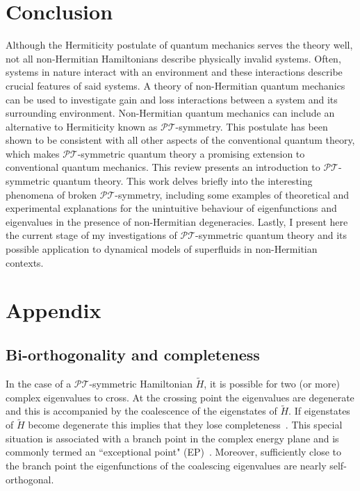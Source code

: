 \documentclass[12pt, a4paper]{report}
\newcommand\PT{\(\mathcal{PT}\)}
\begin{document}
\chapter{Conclusion}\label{Conclusion}
Although the Hermiticity postulate of quantum mechanics serves the theory well, not all non-Hermitian Hamiltonians describe physically invalid systems. Often, systems in nature interact with an environment and these interactions describe crucial features of said systems. A theory of non-Hermitian quantum mechanics can be used to investigate gain and loss interactions between a system and its surrounding environment. Non-Hermitian quantum mechanics can include an alternative to Hermiticity known as \PT-symmetry. This postulate has been shown to be consistent with all other aspects of the conventional quantum theory, which makes \PT-symmetric quantum theory a promising extension to conventional quantum mechanics. This review presents an introduction to \PT-symmetric quantum theory. This work delves briefly into the interesting phenomena of broken \PT-symmetry, including some examples of theoretical and experimental explanations for the unintuitive behaviour of eigenfunctions and eigenvalues in the presence of non-Hermitian degeneracies. Lastly, I present here the current stage of my investigations of \PT-symmetric quantum theory and its possible application to dynamical models of superfluids in non-Hermitian contexts.


\chapter{Appendix}\label{appendix}
\section{Bi-orthogonality and completeness}\label{Biorthogonal}
In the case of a \PT-symmetric Hamiltonian $\tilde{H}$, it is possible for two (or more) complex eigenvalues to cross. At the crossing point the eigenvalues are degenerate and this is accompanied by the coalescence of the eigenstates of $\tilde{H}$. If eigenstates of $\tilde{H}$ become degenerate this implies that they lose completeness~\cite{Brody_2013}. This special situation is associated with a branch point in the complex energy plane and is commonly termed an ``exceptional point" (EP)~\cite{Moiseyev}. Moreover, sufficiently close to the branch point the eigenfunctions of the coalescing eigenvalues are nearly self-orthogonal.
\end{document}
